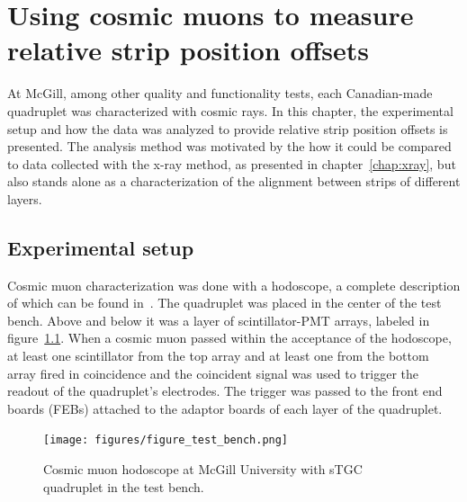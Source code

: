 
\chapter{Using cosmic muons to measure relative strip position offsets}
\label{chap:cosmics}

At McGill, among other quality and functionality tests, each Canadian-made quadruplet was characterized with cosmic rays. In this chapter, the experimental setup and how the data was analyzed to provide relative strip position offsets is presented. The analysis method was motivated by the how it could be compared to data collected with the x-ray method, as presented in chapter~\ref{chap:xray}, but also stands alone as a characterization of the alignment between strips of different layers.

\section{Experimental setup}

Cosmic muon characterization was done with a hodoscope, a complete description of which can be found in~\cite{lefebvre_thesis}.  The quadruplet was placed in the center of the test bench. Above and below it was a layer of scintillator-PMT arrays, labeled in figure~\ref{fig:hodoscope}. When a cosmic muon passed within the acceptance of the hodoscope, at least one scintillator from the top array and at least one from the bottom array fired in coincidence and the coincident signal was used to trigger the readout of the quadruplet's electrodes. The trigger was passed to the front end boards (FEBs) attached to the adaptor boards of each layer of the quadruplet.

\begin{figure}
    \centering
    \texttt{[image: figures/figure\_test\_bench.png]}
    \caption{Cosmic muon hodoscope at McGill University with sTGC quadruplet in the test bench.}
    \label{fig:hodoscope}
\end{figure}

